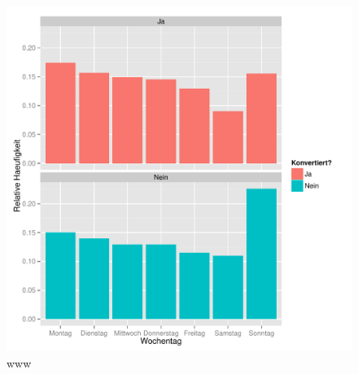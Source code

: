 \begin{figure}[H]
    \centering
    \includegraphics[scale=0.5]{weekday.pdf}
    \caption{www}
    \label{Fig_1}
\end{figure}

